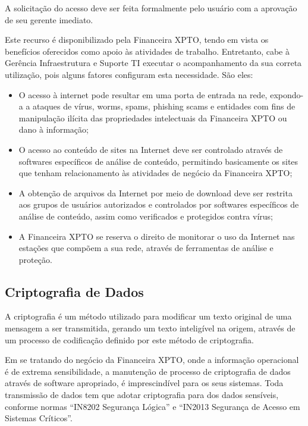 \documentclass[a4paper,12pt]{article}
\begin{document}
A solicitação do acesso deve ser feita formalmente pelo usuário com a aprovação de seu gerente imediato. 

Este recurso é disponibilizado pela Financeira XPTO, tendo em vista os benefícios oferecidos como apoio às atividades de trabalho. Entretanto, cabe à Gerência Infraestrutura e Suporte TI executar o acompanhamento da sua correta utilização, pois alguns fatores configuram esta necessidade. São eles:

\begin{itemize}
    \item O acesso à internet pode resultar em uma porta de entrada na rede, expondo-a a ataques de vírus, worms, spams, phishing scams e entidades com fins de manipulação ilícita das propriedades intelectuais da Financeira XPTO ou dano à informação;
    \item O acesso ao conteúdo de sites na Internet deve ser controlado através de softwares específicos de análise de conteúdo, permitindo basicamente os sites que tenham relacionamento às atividades de negócio da Financeira XPTO;
    \item A obtenção de arquivos da Internet por meio de download deve ser restrita aos grupos de usuários autorizados e controlados por softwares específicos de análise de conteúdo, assim como verificados e protegidos contra vírus;
    \item A Financeira XPTO se reserva o direito de monitorar o uso da Internet nas estações que compõem a sua rede, através de ferramentas de análise e proteção.
\end{itemize}

\subsection{Criptografia de Dados}

A criptografia é um método utilizado para modificar um texto original de uma mensagem a ser transmitida, gerando um texto inteligível na origem, através de um processo de codificação definido por este método de criptografia.

Em se tratando do negócio da Financeira XPTO, onde a informação operacional é de extrema sensibilidade, a manutenção de processo de criptografia de dados através de software apropriado, é imprescindível para os seus sistemas. Toda transmissão de dados tem que adotar criptografia para dos dados sensíveis, conforme normas “IN8202 Segurança Lógica” e “IN2013 Segurança de Acesso em Sistemas Críticos”.
\end{document}
